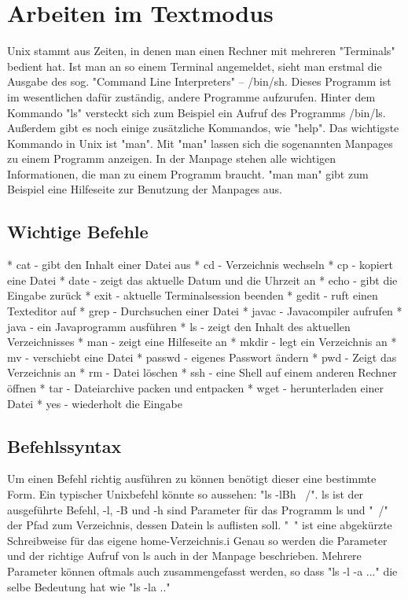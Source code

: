 \section{Arbeiten im Textmodus}
Unix stammt aus Zeiten, in denen man einen Rechner mit mehreren "Terminals" bedient hat. Ist man an so einem Terminal angemeldet, sieht man erstmal die Ausgabe des sog. "Command Line Interpreters" – /bin/sh. Dieses Programm ist im wesentlichen dafür zuständig, andere Programme aufzurufen. Hinter dem Kommando "ls" versteckt sich zum Beispiel ein Aufruf des Programms /bin/ls. Außerdem gibt es noch einige zusätzliche Kommandos, wie "help". Das wichtigste Kommando in Unix ist "man". Mit "man" lassen sich die sogenannten Manpages zu einem Programm anzeigen. In der Manpage stehen alle wichtigen Informationen, die man zu einem Programm braucht.
"man man" gibt zum Beispiel eine Hilfeseite zur Benutzung der Manpages aus.

\subsection{Wichtige Befehle}
* cat - gibt den Inhalt einer Datei aus
* cd - Verzeichnis wechseln
* cp - kopiert eine Datei
* date - zeigt das aktuelle Datum und die Uhrzeit an
* echo - gibt die Eingabe zurück
* exit - aktuelle Terminalsession beenden
* gedit - ruft einen Texteditor auf
* grep - Durchsuchen einer Datei
* javac - Javacompiler aufrufen
* java - ein Javaprogramm ausführen
* ls - zeigt den Inhalt des aktuellen Verzeichnisses
* man - zeigt eine Hilfeseite an
* mkdir - legt ein Verzeichnis an
* mv - verschiebt eine Datei
* passwd - eigenes Passwort ändern
* pwd - Zeigt das Verzeichnis an
* rm - Datei löschen
* ssh - eine Shell auf einem anderen Rechner öffnen
* tar - Dateiarchive packen und entpacken
* wget - herunterladen einer Datei
* yes - wiederholt die Eingabe

\subsection{Befehlssyntax}
Um einen Befehl richtig ausführen zu können benötigt dieser eine bestimmte Form. Ein typischer Unixbefehl könnte so aussehen:
"ls -lBh ~/". ls ist der ausgeführte Befehl, -l, -B und -h sind Parameter für das Programm ls und "~/" der Pfad zum Verzeichnis, dessen Datein ls auflisten soll. "~" ist eine abgekürzte Schreibweise für das eigene home-Verzeichnis.i
Genau so werden die Parameter und der richtige Aufruf von ls auch in der Manpage beschrieben. Mehrere Parameter können oftmals auch zusammengefasst werden, so dass "ls -l -a ..." die selbe Bedeutung hat wie "ls -la .."

